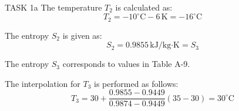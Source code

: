 TASK 1a  
The temperature \( T_2 \) is calculated as:  
\[
T_2 = -10^\circ\text{C} - 6 \, \text{K} = -16^\circ\text{C}
\]

The entropy \( S_2 \) is given as:  
\[
S_2 = 0.9855 \, \text{kJ/kg·K} = S_3
\]

The entropy \( S_3 \) corresponds to values in Table A-9.  

The interpolation for \( T_3 \) is performed as follows:  
\[
T_3 = 30 + \frac{0.9855 - 0.9449}{0.9874 - 0.9449} (35 - 30) = 30^\circ\text{C}
\]